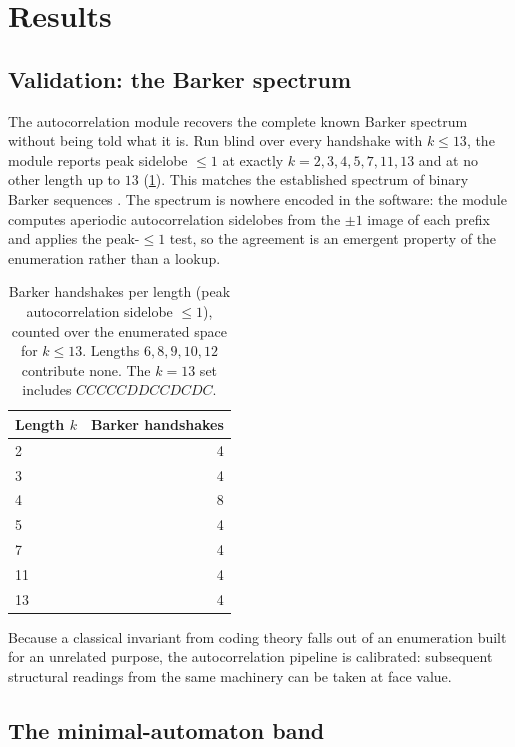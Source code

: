 \section{Results}\label{sec:results}

\subsection{Validation: the Barker spectrum}

The autocorrelation module recovers the complete known Barker spectrum without being told
what it is. Run blind over every handshake with $k\le 13$, the module reports peak sidelobe
$\le 1$ at exactly $k = 2,3,4,5,7,11,13$ and at no other length up to $13$ (\cref{tab:barker}).
This matches the established spectrum of binary Barker sequences \citep{barker1953,turyn1961}.
The spectrum is nowhere encoded in the software: the module computes aperiodic
autocorrelation sidelobes from the $\pm1$ image of each prefix and applies the peak-$\le 1$
test, so the agreement is an emergent property of the enumeration rather than a lookup.

\begin{table}[t]
  \centering
  \caption{Barker handshakes per length (peak autocorrelation sidelobe $\le 1$), counted over
  the enumerated space for $k\le 13$. Lengths $6,8,9,10,12$ contribute none. The $k=13$ set
  includes $CCCCCDDCCDCDC$.}
  \label{tab:barker}
  \begin{tabular}{lr}
    \toprule
    Length $k$ & Barker handshakes \\
    \midrule
    2  & 4 \\
    3  & 4 \\
    4  & 8 \\
    5  & 4 \\
    7  & 4 \\
    11 & 4 \\
    13 & 4 \\
    \bottomrule
  \end{tabular}
\end{table}

Because a classical invariant from coding theory falls out of an enumeration built for an
unrelated purpose, the autocorrelation pipeline is calibrated: subsequent structural readings
from the same machinery can be taken at face value.

\subsection{The minimal-automaton band}

